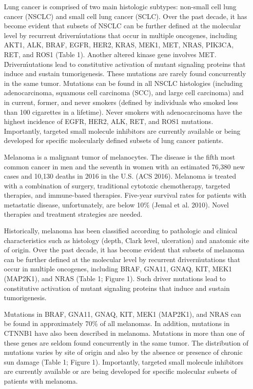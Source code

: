 Lung cancer is comprised of two main histologic subtypes: non-small cell lung
cancer (NSCLC) and small cell lung cancer (SCLC). Over the past decade, it has
become evident that subsets of NSCLC can be further defined at the molecular
level by recurrent \'driver\' mutations that occur in multiple oncogenes,
including AKT1, ALK, BRAF, EGFR, HER2, KRAS, MEK1, MET, NRAS, PIK3CA, RET, and
ROS1 (Table 1). Another altered kinase gene involves MET. \'Driver\' mutations
lead to constitutive activation of mutant signaling proteins that induce and
sustain tumorigenesis. These mutations are rarely found concurrently in the same
tumor. Mutations can be found in all NSCLC histologies (including
adenocarcinoma, squamous cell carcinoma (SCC), and large cell carcinoma) and in
current, former, and never smokers (defined by individuals who smoked less than
100 cigarettes in a lifetime). Never smokers with adenocarcinoma have the
highest incidence of EGFR, HER2, ALK, RET, and ROS1 mutations. Importantly,
targeted small molecule inhibitors are currently available or being developed
for specific molecularly defined subsets of lung cancer patients.

Melanoma is a malignant tumor of melanocytes. The disease is the fifth most
common cancer in men and the seventh in women with an estimated 76,380 new cases
and 10,130 deaths in 2016 in the U.S. (ACS 2016). Melanoma is treated with a
combination of surgery, traditional cytotoxic chemotherapy, targeted therapies,
and immune-based therapies. Five-year survival rates for patients with
metastatic disease, unfortunately, are below 10\% (Jemal et al. 2010). Novel
therapies and treatment strategies are needed.

Historically, melanoma has been classified according to pathologic and clinical
characteristics such as histology (depth, Clark level, ulceration) and anatomic
site of origin. Over the past decade, it has become evident that subsets of
melanoma can be further defined at the molecular level by recurrent \"driver\"
mutations that occur in multiple oncogenes, including BRAF, GNA11, GNAQ, KIT,
MEK1 (MAP2K1), and NRAS (Table 1; Figure 1). Such driver mutations lead to
constitutive activation of mutant signaling proteins that induce and sustain
tumorigenesis.

Mutations in BRAF, GNA11, GNAQ, KIT, MEK1 (MAP2K1), and NRAS can be found in
approximately 70\% of all melanomas. In addition, mutations in CTNNB1 have also
been described in melanoma. Mutations in more than one of these genes are seldom
found concurrently in the same tumor. The distribution of mutations varies by
site of origin and also by the absence or presence of chronic sun damage (Table
1; Figure 1). Importantly, targeted small molecule inhibitors are currently
available or are being developed for specific molecular subsets of patients with
melanoma.

